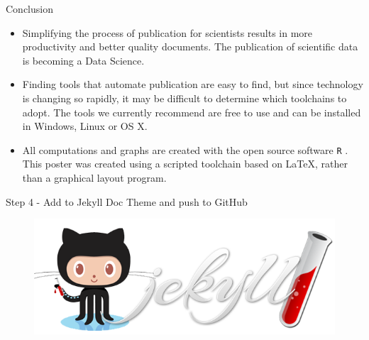 \documentclass[final]{beamer}
\begin{document}
\begin{frame}[fragile]
\begin{columns}[t]
\begin{column}{0.31\linewidth}
\begin{minipage}[t][.955\textheight]{\linewidth}
\vspace{0ex}
\begin{block}{Conclusion}
\begin{itemize}
\item Simplifying the process of publication for scientists results in more productivity and better quality documents. The publication of scientific data is becoming a Data Science.
\item Finding tools that automate publication are easy to find, but since technology is changing so rapidly, it may be difficult to determine which toolchains to adopt. The tools we currently recommend are free to use and can be installed in Windows, Linux or OS X.
\item All computations and graphs are created with the open source software \texttt{R} \cite{R-base}. This poster was created using a scripted toolchain based on LaTeX, rather than a graphical layout program. 
\end{itemize}
\vspace{0ex}
\end{block}
\vfill

\vspace{0ex}
\begin{block}{Step 4 - Add to Jekyll Doc Theme and push to GitHub}
\vspace{0ex}
\begin{figure}
\includegraphics[width=0.55\linewidth]{images/jekyll_github.png}
\end{figure}
\vspace{0ex}
\vfill
\end{block}
\vfill


\end{minipage}
\end{column}
\end{columns}
\end{frame}
\end{document}
